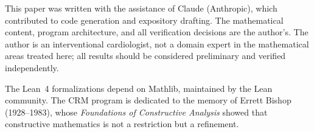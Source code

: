 \documentclass[11pt]{article}
\theoremstyle{plain}
\theoremstyle{definition}
\theoremstyle{remark}
\begin{document}
This paper was written with the assistance of Claude (Anthropic),
which contributed to code generation and expository drafting.
The mathematical content, program architecture, and all
verification decisions are the author's.  The author is an
interventional cardiologist, not a domain expert in the mathematical
areas treated here; all results should be considered preliminary
and verified independently.

The Lean~4 formalizations depend on Mathlib, maintained by the
Lean community.  The CRM program is dedicated to the memory of
Errett Bishop (1928--1983), whose \emph{Foundations of Constructive
Analysis} showed that constructive mathematics is not a restriction
but a refinement.


\end{document}
